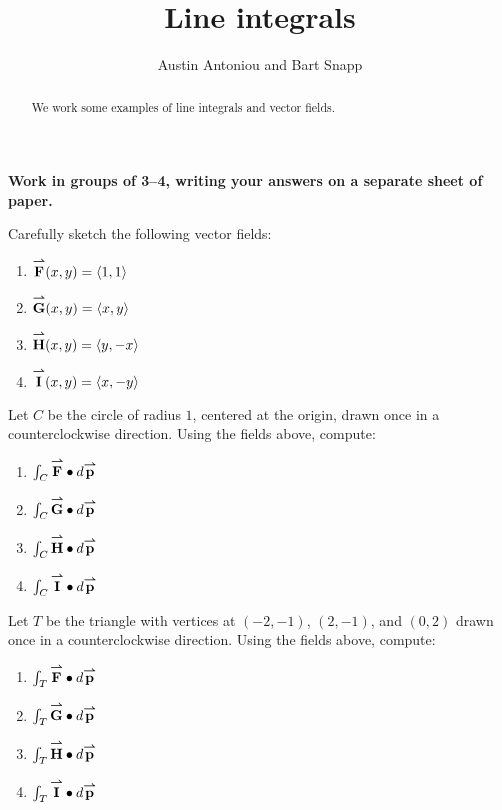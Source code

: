 \documentclass[noauthor,nooutcomes]{ximera}
\author{Austin Antoniou and Bart Snapp}
\title[Collaborate:]{Line integrals}
\begin{document}
\begin{abstract}
  We work some examples of line integrals and vector fields.
\end{abstract}
\maketitle

\textbf{Work in groups of 3--4, writing your answers on a separate
  sheet of paper.}

\begin{problem}
  Carefully sketch the following vector fields:
  \begin{enumerate}
  \item $\vec{F}(x,y) = \vector{1,1}$
  \item $\vec{G}(x,y) = \vector{x,y}$
  \item $\vec{H}(x,y) = \vector{y,-x}$
  \item $\vec{I}(x,y) = \vector{x,-y}$
  \end{enumerate}
\end{problem}

\begin{problem}
  Let $C$ be the circle of radius $1$, centered at the origin, drawn
  once in a counterclockwise direction. Using the fields above,
  compute:
  \begin{enumerate}
  \item $\int_C \vec{F}\dotp \d \vec{p}$
  \item $\int_C \vec{G}\dotp \d \vec{p}$
  \item $\int_C \vec{H}\dotp \d \vec{p}$
  \item $\int_C \vec{I}\dotp \d \vec{p}$
  \end{enumerate}
\end{problem}

\begin{problem}
  Let $T$ be the triangle with vertices at $(-2,-1)$, $(2,-1)$, and
  $(0,2)$ drawn once in a counterclockwise direction. Using the fields
  above, compute:
  \begin{enumerate}
  \item $\int_T \vec{F}\dotp \d \vec{p}$
  \item $\int_T \vec{G}\dotp \d \vec{p}$
  \item $\int_T \vec{H}\dotp \d \vec{p}$
  \item $\int_T \vec{I}\dotp \d \vec{p}$
  \end{enumerate}
\end{problem}
\end{document}
